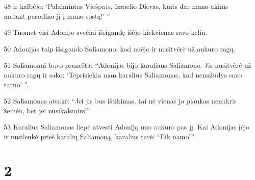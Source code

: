 \par 48 ir kalbėjo: ‘Palaimintas Viešpats, Izraelio Dievas, kuris dar mano akims matant pasodino jį į mano sostą!’ ” 
\par 49 Tuomet visi Adonijo svečiai išsigandę išėjo kiekvienas savo keliu. 
\par 50 Adonijas taip išsigando Saliamono, kad nuėjo ir nusitvėrė už aukuro ragų. 
\par 51 Saliamonui buvo pranešta: “Adonijas bijo karaliaus Saliamono. Jis nusitvėrė už aukuro ragų ir sako: ‘Teprisiekia man karalius Saliamonas, kad nenužudys savo tarno’ ”. 
\par 52 Saliamonas atsakė: “Jei jis bus ištikimas, tai nė vienas jo plaukas nenukris žemėn, bet jei nusikals­mirs!” 
\par 53 Karalius Saliamonas liepė atvesti Adoniją nuo aukuro pas jį. Kai Adonijas įėjo ir nusilenkė prieš karalių Saliamoną, karalius tarė: “Eik namo!”


\chapter{2}

